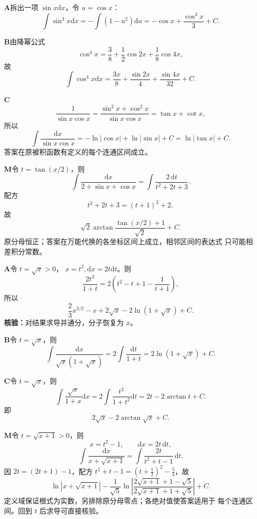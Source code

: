 \begin{solutionBox}
\textbf{A}\quad 拆出一项 \(\sin x\mathrm dx\)，令 \(u=\cos x\)：
\[
\int\sin^3x\mathrm dx
=-\int(1-u^2)\mathrm du
=-\cos x+\frac{\cos^3x}{3}+C.
\]
\end{solutionBox}
\begin{solutionBox}
\textbf{B}\quad 由降幂公式
\[
\cos^4x=\frac38+\frac12\cos2x+\frac18\cos4x,
\]
故
\[
\int\cos^4x\mathrm dx
=\frac{3x}{8}+\frac{\sin2x}{4}+\frac{\sin4x}{32}+C.
\]
\end{solutionBox}
\begin{solutionBox}
\textbf{C}\quad
\[
\frac1{\sin x\cos x}
=\frac{\sin^2x+\cos^2x}{\sin x\cos x}
=\tan x+\cot x,
\]
所以
\[
\int\frac{\mathrm dx}{\sin x\cos x}
=-\ln|\cos x|+\ln|\sin x|+C
=\ln|\tan x|+C.
\]
答案在原被积函数有定义的每个连通区间成立。
\end{solutionBox}
\begin{solutionBox}
\textbf{M}\quad 令 \(t=\tan(x/2)\)，则
\[
\int\frac{\mathrm dx}{2+\sin x+\cos x}
=\int\frac{2\,\mathrm dt}{t^2+2t+3}.
\]
配方
\[
t^2+2t+3=(t+1)^2+2,
\]
故
\[
\boxed{
\sqrt2\arctan
\frac{\tan(x/2)+1}{\sqrt2}+C
}.
\]
原分母恒正；答案在万能代换的各坐标区间上成立，相邻区间的表达式
只可能相差积分常数。
\end{solutionBox}

\begin{solutionBox}
\textbf{A}\quad 令 \(t=\sqrt x>0\)，
\(x=t^2,\mathrm dx=2t\mathrm dt\)。则
\[
\frac{2t^3}{1+t}
=2\left(t^2-t+1-\frac1{t+1}\right),
\]
所以
\[
\boxed{
\frac23x^{3/2}-x+2\sqrt x-2\ln(1+\sqrt x)+C
}.
\]
\textbf{核验：}对结果求导并通分，分子恢复为 \(x\)。
\end{solutionBox}
\begin{solutionBox}
\textbf{B}\quad 令 \(t=\sqrt x\)，则
\[
\int\frac{\mathrm dx}{\sqrt x(1+\sqrt x)}
=2\int\frac{\mathrm dt}{1+t}
=2\ln(1+\sqrt x)+C.
\]
\end{solutionBox}
\begin{solutionBox}
\textbf{C}\quad 令 \(t=\sqrt x\)，则
\[
\int\frac{\sqrt x}{1+x}\mathrm dx
=2\int\frac{t^2}{1+t^2}\mathrm dt
=2t-2\arctan t+C.
\]
即
\[
\boxed{2\sqrt x-2\arctan\sqrt x+C}.
\]
\end{solutionBox}
\begin{solutionBox}
\textbf{M}\quad 令 \(t=\sqrt{x+1}>0\)，则
\[
x=t^2-1,\qquad \mathrm dx=2t\,\mathrm dt,
\]
\[
\int\frac{\mathrm dx}{x+\sqrt{x+1}}
=\int\frac{2t}{t^2+t-1}\,\mathrm dt.
\]
因 \(2t=(2t+1)-1\)，配方
\(t^2+t-1=(t+\frac12)^2-\frac54\)，故
\[
\boxed{
\ln|x+\sqrt{x+1}|
-\frac1{\sqrt5}\ln\left|
\frac{2\sqrt{x+1}+1-\sqrt5}
{2\sqrt{x+1}+1+\sqrt5}
\right|+C
}.
\]
定义域保证根式为实数，另排除原分母零点；各绝对值使答案适用于
每个连通区间。回到 \(t\) 后求导可直接核验。
\end{solutionBox}

